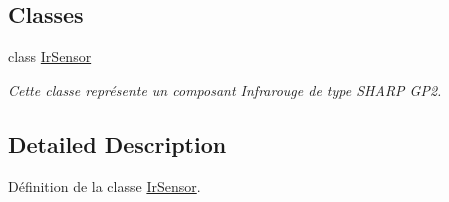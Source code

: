\subsection*{Classes}
\begin{DoxyCompactItemize}
\item 
class \hyperlink{classIrSensor}{Ir\+Sensor}
\begin{DoxyCompactList}\small\item\em Cette classe représente un composant Infrarouge de type S\+H\+A\+RP G\+P2. \end{DoxyCompactList}\end{DoxyCompactItemize}


\subsection{Detailed Description}
Définition de la classe \hyperlink{classIrSensor}{Ir\+Sensor}. 

